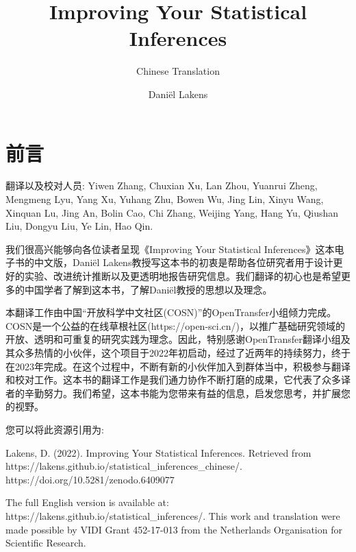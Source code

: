 \documentclass[
  letterpaper,
  DIV=11,
  numbers=noendperiod]{scrreprt}
\title{Improving Your Statistical Inferences}
\subtitle{Chinese Translation}
\author{Daniël Lakens}
\date{}
\renewcommand*\contentsname{Table of contents}
\newcommand\contentsname{Table of contents}
\begin{document}
\maketitle
\ifdefined\Shaded\renewenvironment{Shaded}{\begin{tcolorbox}[interior hidden, boxrule=0pt, borderline west={3pt}{0pt}{shadecolor}, sharp corners, breakable, enhanced, frame hidden]}{\end{tcolorbox}}\fi

\renewcommand*\contentsname{Table of contents}
{
\hypersetup{linkcolor=}
\setcounter{tocdepth}{2}
\tableofcontents
}

\hypertarget{ux524dux8a00}{%
\chapter*{前言}\label{ux524dux8a00}}


翻译以及校对人员: Yiwen Zhang, Chuxian Xu, Lan Zhou, Yuanrui Zheng,
Mengmeng Lyu, Yang Xu, Yuhang Zhu, Bowen Wu, Jing Lin, Xinyu Wang,
Xinquan Lu, Jing An, Bolin Cao, Chi Zhang, Weijing Yang, Hang Yu,
Qiushan Liu, Dongyu Liu, Ye Lin, Hao Qin.

我们很高兴能够向各位读者呈现《Improving Your Statistical
Inferences》这本电子书的中文版，Daniël
Lakens教授写这本书的初衷是帮助各位研究者用于设计更好的实验、改进统计推断以及更透明地报告研究信息。我们翻译的初心也是希望更多的中国学者了解到这本书，了解Daniël教授的思想以及理念。

本翻译工作由中国``开放科学中文社区(COSN)''的OpenTransfer小组倾力完成。COSN是一个公益的在线草根社区(https://open-sci.cn/)，以推广基础研究领域的开放、透明和可重复的研究实践为理念。因此，特别感谢OpenTransfer翻译小组及其众多热情的小伙伴，这个项目于2022年初启动，经过了近两年的持续努力，终于在2023年完成。在这个过程中，不断有新的小伙伴加入到群体当中，积极参与翻译和校对工作。这本书的翻译工作是我们通力协作不断打磨的成果，它代表了众多译者的辛勤努力。我们希望，这本书能为您带来有益的信息，启发您思考，并扩展您的视野。

您可以将此资源引用为:

Lakens, D. (2022). Improving Your Statistical Inferences. Retrieved from
https://lakens.github.io/statistical\_inferences\_chinese/.
https://doi.org/10.5281/zenodo.6409077

The full English version is available at:
https://lakens.github.io/statistical\_inferences/. This work and
translation were made possible by VIDI Grant 452-17-013 from the
Netherlands Organisation for Scientific Research.
\end{document}
